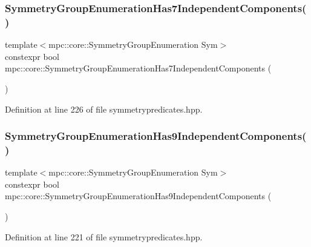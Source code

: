 \subsubsection{\texorpdfstring{Symmetry\+Group\+Enumeration\+Has7\+Independent\+Components()}{SymmetryGroupEnumerationHas7IndependentComponents()}}
{\footnotesize\ttfamily template$<$mpc\+::core\+::\+Symmetry\+Group\+Enumeration Sym$>$ \\
constexpr bool mpc\+::core\+::\+Symmetry\+Group\+Enumeration\+Has7\+Independent\+Components (\begin{DoxyParamCaption}{ }\end{DoxyParamCaption})\hspace{0.3cm}{\ttfamily [inline]}}



Definition at line 226 of file symmetrypredicates.\+hpp.

\mbox{\label{namespacempc_1_1core_a5da30dc818b56accc08364c93c331924}} 
\subsubsection{\texorpdfstring{Symmetry\+Group\+Enumeration\+Has9\+Independent\+Components()}{SymmetryGroupEnumerationHas9IndependentComponents()}}
{\footnotesize\ttfamily template$<$mpc\+::core\+::\+Symmetry\+Group\+Enumeration Sym$>$ \\
constexpr bool mpc\+::core\+::\+Symmetry\+Group\+Enumeration\+Has9\+Independent\+Components (\begin{DoxyParamCaption}{ }\end{DoxyParamCaption})\hspace{0.3cm}{\ttfamily [inline]}}



Definition at line 221 of file symmetrypredicates.\+hpp.

\mbox{\label{namespacempc_1_1core_a384195f1b9c2914504451efcbd89f188}} 
